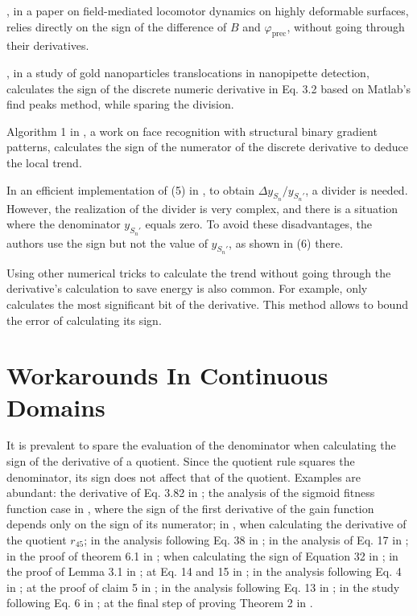 \documentclass[11pt]{book}
\begin{document}
\cite{li2020field}, in a paper on field-mediated locomotor dynamics on highly deformable surfaces, relies directly on the sign of the difference
of $B$ and $\varphi_{\text{prec}}$, without going through their
derivatives.

\cite{cheng2018peak}, in a study of gold nanoparticles translocations in nanopipette detection, calculates the sign of the discrete numeric
derivative in Eq. 3.2 based on Matlab's find peaks method, while sparing
the division.

 Algorithm 1 in \cite{huang2017robust}, a work on face recognition with structural binary gradient
patterns, calculates the sign of the
numerator of the discrete derivative to deduce the local trend.

In an efficient implementation of (5) in \cite{chen2020split}, to
obtain $\Delta y_{S_{n}}/y_{S_{n}'}$, a divider is needed.
However, the realization of the divider is very complex, and there
is a situation where the denominator $y_{S_{n}'}$ equals zero. To
avoid these disadvantages, the authors use the sign but not the value
of $y_{S_{n}'}$, as shown in (6) there.

Using other numerical tricks to calculate the trend without going
through the derivative's calculation to save energy is also common.
For example, \cite{wang2019e2} only calculates the most significant
bit of the derivative. This method allows to bound the error of calculating
its sign.


\section{Workarounds In Continuous Domains}

It is prevalent to spare the evaluation of the denominator when calculating
the sign of the derivative of a quotient. Since the quotient rule
squares the denominator, its sign does not affect that of the quotient.
Examples are abundant: the derivative of Eq. 3.82 in \cite{xiao2017passivity};
the analysis of the sigmoid fitness function case in \cite{gajer2009examining}, where
the sign of the first derivative of the gain function depends only
on the sign of its numerator; in \cite{shevkunov2011effect}, when
calculating the derivative of the quotient $r_{45}$; in the analysis
following Eq. 38 in \cite{palley2019unemployment}; in the analysis
of Eq. 17 in \cite{offiong2016determining}; in the proof of theorem
6.1 in \cite{van2017economic}; when calculating the sign of Equation
32 in \cite{seno2020sis}; in the proof of Lemma 3.1 in \cite{bonettini2021variable}; at Eq. 14 and 15 in \cite{chen2017direct}; in the analysis following Eq. 4 in \cite{sheremeta2021impact}; at the proof of claim 5 in \cite{bell2018three};
in the analysis following Eq. 13 in \cite{silvar}; in the study following
Eq. 6 in \cite{morel2005wood}; at the final step of proving Theorem
2 in \cite[p.~38]{valavi2020time}.
\end{document}
